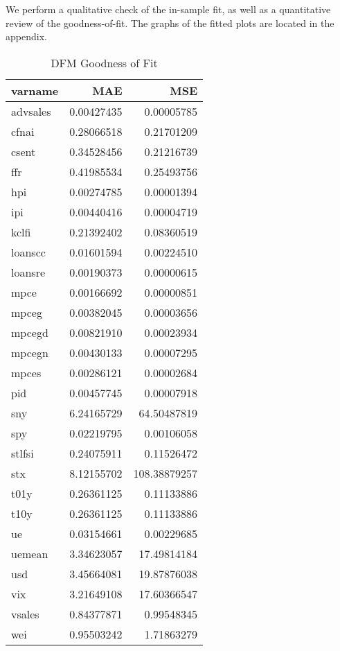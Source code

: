 \documentclass[11pt, letterpaper]{article}\usepackage[]{graphicx}\usepackage[]{color}
\begin{document}
We perform a qualitative check of the in-sample fit, as well as a quantitative review of the goodness-of-fit. The graphs of the fitted plots are located in the appendix.
\begin{table}[H]
\centering
\begingroup\footnotesize
\begin{tabular}{lrr}
  \hline
varname & MAE & MSE \\ 
  \hline
advsales & 0.00427435 & 0.00005785 \\ 
  cfnai & 0.28066518 & 0.21701209 \\ 
  csent & 0.34528456 & 0.21216739 \\ 
  ffr & 0.41985534 & 0.25493756 \\ 
  hpi & 0.00274785 & 0.00001394 \\ 
  ipi & 0.00440416 & 0.00004719 \\ 
  kclfi & 0.21392402 & 0.08360519 \\ 
  loanscc & 0.01601594 & 0.00224510 \\ 
  loansre & 0.00190373 & 0.00000615 \\ 
  mpce & 0.00166692 & 0.00000851 \\ 
  mpceg & 0.00382045 & 0.00003656 \\ 
  mpcegd & 0.00821910 & 0.00023934 \\ 
  mpcegn & 0.00430133 & 0.00007295 \\ 
  mpces & 0.00286121 & 0.00002684 \\ 
  pid & 0.00457745 & 0.00007918 \\ 
  sny & 6.24165729 & 64.50487819 \\ 
  spy & 0.02219795 & 0.00106058 \\ 
  stlfsi & 0.24075911 & 0.11526472 \\ 
  stx & 8.12155702 & 108.38879257 \\ 
  t01y & 0.26361125 & 0.11133886 \\ 
  t10y & 0.26361125 & 0.11133886 \\ 
  ue & 0.03154661 & 0.00229685 \\ 
  uemean & 3.34623057 & 17.49814184 \\ 
  usd & 3.45664081 & 19.87876038 \\ 
  vix & 3.21649108 & 17.60366547 \\ 
  vsales & 0.84377871 & 0.99548345 \\ 
  wei & 0.95503242 & 1.71863279 \\ 
   \hline
\end{tabular}
\endgroup
\caption{DFM Goodness of Fit} 
\end{table}
\end{document}
